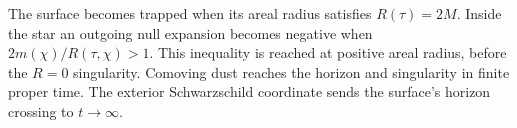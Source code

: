 \begin{enumerate}[leftmargin=2.8em,itemsep=1.2em]
The surface becomes trapped when its areal radius satisfies \(R(\tau)=2M\).
Inside the star an outgoing null expansion becomes negative when
\(2m(\chi)/R(\tau,\chi)>1\).  This inequality is reached at positive areal
radius, before the \(R=0\) singularity.  Comoving dust reaches the horizon and
singularity in finite proper time.  The exterior Schwarzschild coordinate
sends the surface's horizon crossing to \(t\to\infty\).
\end{enumerate}
